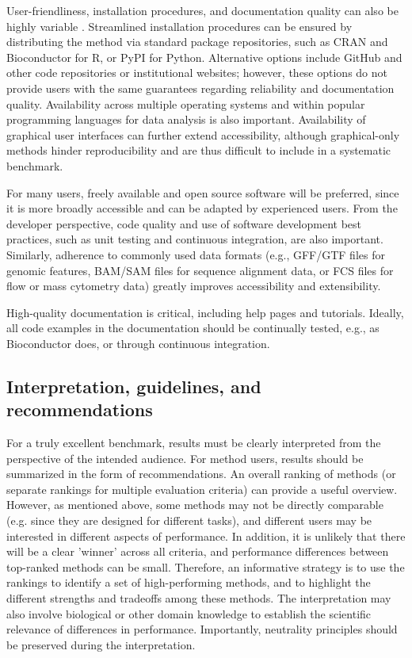 User-friendliness, installation procedures, and documentation quality can also be highly variable \cite{mangul_improvingusabilityarchival_2019,mangul_challengesrecommendationsimprove_2019}. Streamlined installation procedures can be ensured by distributing the method via standard package repositories, such as CRAN and Bioconductor for R, or PyPI for Python. Alternative options include GitHub and other code repositories or institutional websites; however, these options do not provide users with the same guarantees regarding reliability and documentation quality. Availability across multiple operating systems and within popular programming languages for data analysis is also important. Availability of graphical user interfaces can further extend accessibility, although graphical-only methods hinder reproducibility and are thus difficult to include in a systematic benchmark.

For many users, freely available and open source software will be preferred, since it is more broadly accessible and can be adapted by experienced users. From the developer perspective, code quality and use of software development best practices, such as unit testing and continuous integration, are also important. Similarly, adherence to commonly used data formats (e.g., GFF/GTF files for genomic features, BAM/SAM files for sequence alignment data, or FCS files for flow or mass cytometry data) greatly improves accessibility and extensibility.

High-quality documentation is critical, including help pages and tutorials. Ideally, all code examples in the documentation should be continually tested, e.g., as Bioconductor does, or through continuous integration.

\subsection{Interpretation, guidelines, and recommendations}

For a truly excellent benchmark, results must be clearly interpreted from the perspective of the intended audience. For method users, results should be summarized in the form of recommendations. An overall ranking of methods (or separate rankings for multiple evaluation criteria) can provide a useful overview. However, as mentioned above, some methods may not be directly comparable (e.g. since they are designed for different tasks), and different users may be interested in different aspects of performance. In addition, it is unlikely that there will be a clear 'winner' across all criteria, and performance differences between top-ranked methods can be small. Therefore, an informative strategy is to use the rankings to identify a set of high-performing methods, and to highlight the different strengths and tradeoffs among these methods. The interpretation may also involve biological or other domain knowledge to establish the scientific relevance of differences in performance. Importantly, neutrality principles should be preserved during the interpretation.

